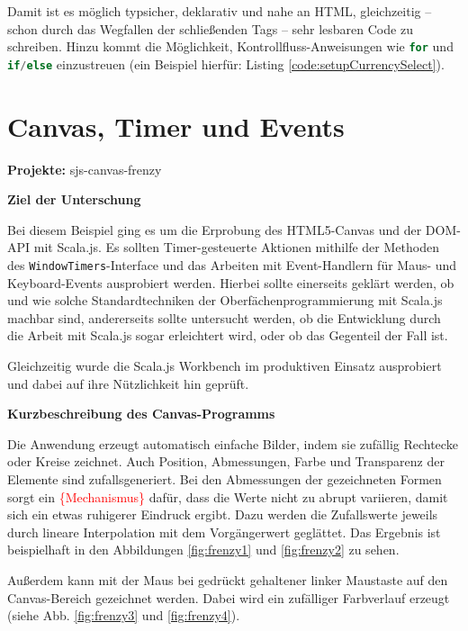 \documentclass[a4paper, 12pt, hidelinks, listof=totoc, listoftables=totoc, bibliography=totoc]{scrreprt}
\newcommand{\code}[1]{\lstinline[language=Scala, style=inline]|#1|}
\newcommand{\scala}[1]{\lstinline[language=Scala, style=inline]|#1|}
\newcommand{\TODOi}[1]{\textcolor{red}{\{#1\}}}
\newcommand{\MyMiniSec}[1]{\rmfamily\fontsize{12}{15}\selectfont
	\vspace{7pt}\textbf{#1} %
}
\begin{document}
Damit ist es möglich typsicher, deklarativ und nahe an \ac{HTML}, gleichzeitig -- schon durch das Wegfallen der schließenden Tags -- sehr lesbaren Code zu schreiben. Hinzu kommt die Möglichkeit, Kontrollfluss-Anweisungen wie \scala{for} und \scala{if/else} einzustreuen (ein Beispiel hierfür: Listing \ref{code:setupCurrencySelect}).



\section{Canvas, Timer und Events}

\textbf{Projekte:} sjs-canvas-frenzy

\MyMiniSec{Ziel der Unterschung}

Bei diesem Beispiel ging es um die Erprobung des HTML5-Canvas und der \ac{DOM}-\ac{API} mit Scala.js. Es sollten Timer-gesteuerte Aktionen mithilfe der Methoden des \code{WindowTimers}-Interface und das Arbeiten mit Event-Handlern für Maus- und Keyboard-Events ausprobiert werden. Hierbei sollte einerseits geklärt werden, ob und wie solche Standardtechniken der Oberfächenprogrammierung mit Scala.js machbar sind, andererseits sollte untersucht werden, ob die Entwicklung durch die Arbeit mit Scala.js sogar erleichtert wird, oder ob das Gegenteil der Fall ist.

Gleichzeitig wurde die Scala.js Workbench im produktiven Einsatz ausprobiert und dabei auf ihre Nützlichkeit hin geprüft.


\MyMiniSec{Kurzbeschreibung des Canvas-Programms}

Die Anwendung erzeugt automatisch einfache Bilder, indem sie zufällig Rechtecke oder Kreise zeichnet. Auch Position, Abmessungen, Farbe und Transparenz der Elemente sind zufallsgeneriert. Bei den Abmessungen der gezeichneten Formen sorgt ein \TODOi{Mechanismus} dafür, dass die Werte nicht zu abrupt variieren, damit sich ein etwas ruhigerer Eindruck ergibt. Dazu werden die Zufallswerte jeweils durch lineare Interpolation mit dem Vorgängerwert geglättet. Das Ergebnis ist beispielhaft in den Abbildungen \ref{fig:frenzy1} und \ref{fig:frenzy2} zu sehen.

Außerdem kann mit der Maus bei gedrückt gehaltener linker Maustaste auf den Canvas-Bereich gezeichnet werden. Dabei wird ein zufälliger Farbverlauf erzeugt (siehe Abb. \ref{fig:frenzy3} und \ref{fig:frenzy4}).
\end{document}
